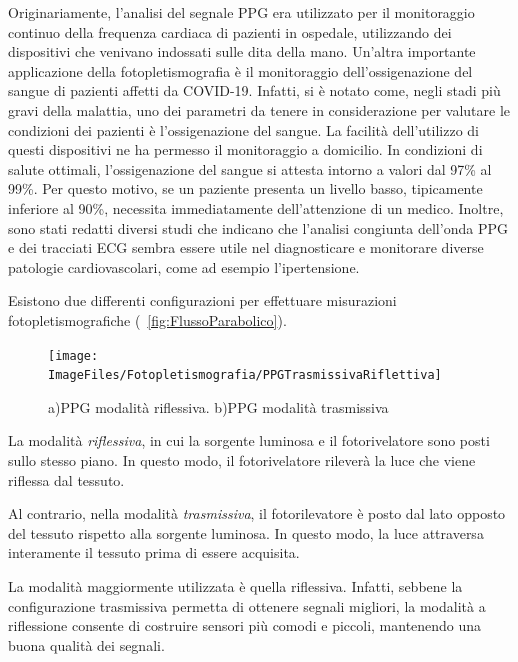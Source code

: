 Originariamente, l'analisi del segnale PPG era utilizzato per il monitoraggio continuo della frequenza cardiaca di pazienti in ospedale, utilizzando dei dispositivi che venivano indossati sulle dita della mano. Un'altra importante applicazione della fotopletismografia è il monitoraggio dell'ossigenazione del sangue di pazienti affetti da COVID-19. Infatti, si è notato come, negli stadi più gravi della malattia, uno dei parametri da tenere in considerazione per valutare le condizioni dei pazienti è l'ossigenazione del sangue. La facilità dell'utilizzo di questi dispositivi ne ha permesso il monitoraggio a domicilio. In condizioni di salute ottimali, l'ossigenazione del sangue si attesta intorno a valori dal 97\% al 99\%. Per questo motivo, se un paziente presenta un livello basso, tipicamente inferiore al 90\%, necessita immediatamente dell'attenzione di un medico. Inoltre, sono stati redatti diversi studi che indicano che l'analisi congiunta dell'onda PPG e dei tracciati ECG sembra essere utile nel diagnosticare e monitorare diverse patologie cardiovascolari, come ad esempio l'ipertensione\cite{Elgendi2019}. 

Esistono due differenti configurazioni per effettuare misurazioni fotopletismografiche (\Fig~\ref{fig:FlussoParabolico}).
\begin{figure}[h]
	\centering
	\texttt{[image: ImageFiles/Fotopletismografia/PPGTrasmissivaRiflettiva]}
	\caption{a)PPG modalità riflessiva. b)PPG modalità trasmissiva}
	\label{fig:PPGTrasmissivaRiflettiva}
\end{figure}

La modalità \textit{riflessiva}, in cui la sorgente luminosa e il fotorivelatore sono posti sullo stesso piano. In questo modo, il fotorivelatore rileverà la luce che viene riflessa dal tessuto. 

Al contrario, nella modalità \textit{trasmissiva}, il fotorilevatore è posto dal lato opposto del tessuto rispetto alla sorgente luminosa. In questo modo, la luce attraversa interamente il tessuto prima di essere acquisita. 

La modalità maggiormente utilizzata è quella riflessiva.  Infatti, sebbene la configurazione trasmissiva permetta di ottenere segnali migliori, la modalità a riflessione consente di costruire sensori più comodi e piccoli, mantenendo una buona qualità dei segnali.

